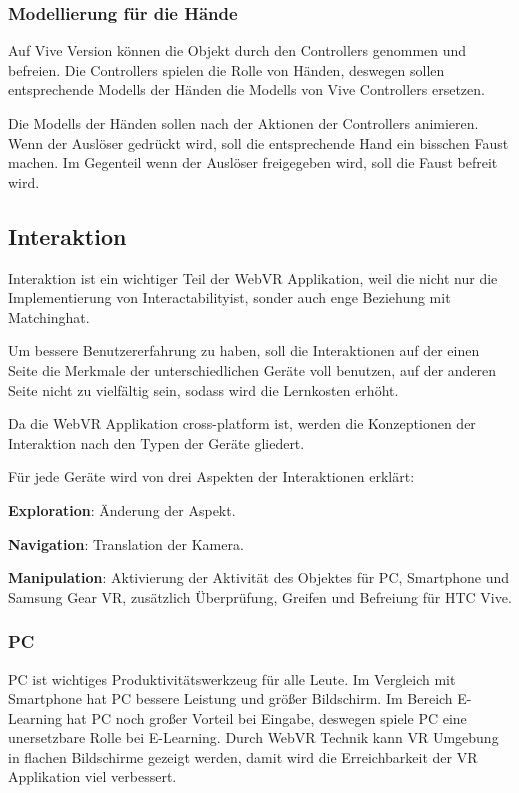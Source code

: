    \subsubsection{Modellierung für die Hände}
   Auf Vive Version können die Objekt durch den Controllers genommen und befreien. Die Controllers spielen die Rolle von Händen, deswegen sollen entsprechende Modells der Händen die Modells von Vive Controllers ersetzen.
   
   Die Modells der Händen sollen nach der Aktionen der Controllers animieren. Wenn der Auslöser gedrückt wird, soll die entsprechende Hand ein bisschen Faust machen. Im Gegenteil wenn der Auslöser freigegeben wird, soll die Faust befreit wird.

 \subsection{Interaktion}
 Interaktion ist ein wichtiger Teil der WebVR Applikation, weil die nicht nur die Implementierung von \glqq Interactability\grqq ist, sonder auch enge Beziehung mit \glqq Matching\grqq hat.
 
 Um bessere Benutzererfahrung zu haben, soll die Interaktionen auf der einen Seite die Merkmale der unterschiedlichen Geräte voll benutzen, auf der anderen Seite nicht zu vielfältig sein, sodass wird die Lernkosten erhöht. 
 
 Da die WebVR Applikation cross-platform ist, werden die Konzeptionen der Interaktion nach den Typen der Geräte gliedert.

 Für jede Geräte wird von drei Aspekten der Interaktionen erklärt:
 
 \textbf{Exploration}: Änderung der Aspekt.
 
 \textbf{Navigation}: Translation der Kamera.
 
 \textbf{Manipulation}: Aktivierung der Aktivität des Objektes für PC, Smartphone und Samsung Gear VR, zusätzlich Überprüfung, Greifen und Befreiung für HTC Vive.

 \subsubsection{PC}
 PC ist wichtiges Produktivitätswerkzeug für alle Leute. Im Vergleich mit Smartphone hat PC bessere Leistung und größer Bildschirm. Im Bereich E-Learning hat PC noch großer Vorteil bei Eingabe, deswegen spiele PC eine unersetzbare Rolle bei E-Learning. Durch WebVR Technik kann VR Umgebung in flachen Bildschirme gezeigt werden, damit wird die Erreichbarkeit der VR Applikation viel verbessert. 
 
